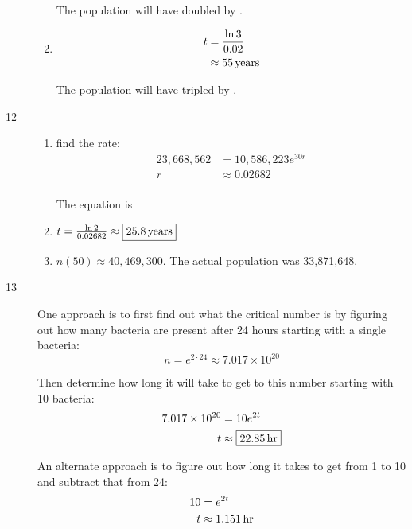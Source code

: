 \documentclass{exam}
\begin{document}
\begin{description}
\begin{enumerate}[a]
            The population will have doubled by .

          \item 
            \begin{align*}
              t & = \frac{\ln 3}{0.02} \\
                & \approx \unit[55]{years} \\
            \end{align*}

            The population will have tripled by .
        \end{enumerate}

      \item[12] 
        \begin{enumerate}[a]
          \item 
            find the rate:
            \begin{align*}
              23,668,562 & = 10,586,223 e^{30r} \\
              r          & \approx 0.02682 \\
            \end{align*}

            The equation is 

          \item $t = \frac{\ln 2}{0.02682} \approx \boxed{ \unit[25.8]{years} }$

          \item $n(50) \approx \boxed{40,469,300}$.  The actual population was 33,871,648.
        \end{enumerate}

      \item[13] 
        One approach is to first find out what the critical number is by figuring out how many bacteria are present
        after 24 hours starting with a single bacteria:
        \[
          n = e^{2 \cdot 24} \approx 7.017 \times 10^{20}
        \]
        
        Then determine how long it will take to get to this number starting with 10 bacteria:
        \begin{align*}
          7.017 \times 10^{20} & = 10 e^{2t} \\
          t                    & \approx \boxed{\unit[22.85]{hr}} \\
        \end{align*}

        An alternate approach is to figure out how long it takes to get from 1 to 10 and subtract that from 24:
        \begin{align*}
          10 & = e^{2t} \\
          t  & \approx \unit[1.151]{hr} \\
        \end{align*}


\end{description}
\end{document}
